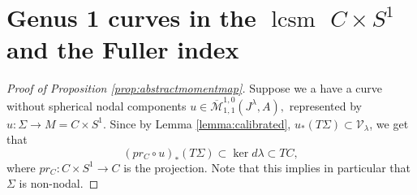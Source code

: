 \documentclass{amsart}
\numberwithin{equation}{section}
\newtheorem{lemma}[equation]{Lemma}
\theoremstyle{definition}
\theoremstyle{remark}
\DeclareMathOperator{\lcsm}{lcsm}
\begin{document}
\section {Genus 1 curves in the $\lcsm$ $C \times S ^{1} $ and the Fuller index} \label{sectionFuller}  
\begin{proof}[Proof of Proposition \ref{prop:abstractmomentmap}] %
Suppose we a have a curve without spherical nodal components  $u \in \overline{\mathcal{M}}_{1,1} ^{1,0}  ({J} ^{\lambda}, A), $ represented by $u: \Sigma \to M=C \times S ^{1} $. 
Since by Lemma \ref{lemma:calibrated}, $u_*(T\Sigma) \subset \mathcal{V} _{\lambda} $, we get that
$$(pr _{C } \circ u )_* (T\Sigma) \subset \ker d\lambda \subset TC,$$ where $pr _{C}: C \times S ^{1} \to C  $ is the projection. Note that this implies in particular that $\Sigma$ is non-nodal.
     

\end{proof}
\end{document}
